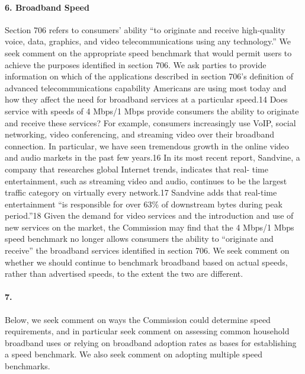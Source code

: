 \paragraph{6. Broadband Speed}
Section 706 refers to consumers' ability ``to originate and receive high-quality voice, data, graphics, and video telecommunications using any technology.''
We seek comment on the
appropriate speed benchmark that would permit users to achieve the purposes identified in section 706. We ask parties to provide information on which of the applications described in section 706’s definition of advanced telecommunications capability
Americans are using most today and how they affect the
need for broadband services at a particular speed.14
Does service with speeds of 4 Mbps/1 Mbps provide
consumers the ability to originate and receive these services? For example, consumers increasingly use VoIP, social networking, video conferencing, and streaming video over their broadband connection.
In
particular, we have seen tremendous growth in the online video and audio markets in the past few years.16 In its most recent report, Sandvine, a company that researches global Internet trends, indicates that real- time entertainment, such as streaming video and audio, continues to be the largest traffic category on virtually every network.17
Sandvine adds that real-time entertainment ``is responsible for over 63\% of
downstream bytes during peak period.''18
Given the demand for video services and the introduction and
use of new services on the market, the Commission may find that the 4 Mbps/1 Mbps speed benchmark no longer allows consumers the ability to ``originate and receive'' the broadband services identified in section 706. We seek comment on whether we should continue to benchmark broadband based on actual speeds, rather than advertised speeds, to the extent the two are different.

\paragraph{7. } Below, we seek comment on ways the Commission could determine speed requirements,
and in particular seek comment on assessing common household broadband uses or relying on broadband adoption rates as bases for establishing a speed benchmark. We also seek comment on adopting multiple speed benchmarks.

